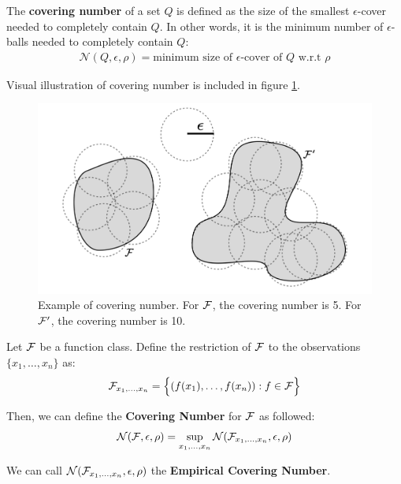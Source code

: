\begin{definition}
    The \textbf{covering number} of a set $Q$ is defined as the size of the smallest $\epsilon$-cover needed to completely contain $Q$. In other words, it is the minimum number of $\epsilon$-balls needed to completely contain $Q$:
    \begin{align*}
        \mathcal{N}(Q, \epsilon, \rho) = \text{minimum size of $\epsilon$-cover of $Q$ w.r.t $\rho$}
    \end{align*}

    \noindent Visual illustration of covering number is included in figure \ref{fig:covering_number}.
\end{definition}

\begin{figure}[ht]
    \centering
    \includegraphics[width=\textwidth]{figures/covering_number.png}
    \caption{Example of covering number. For $\mathcal{F}$, the covering number is 5. For $\mathcal{F}'$, the covering number is 10.}
    \label{fig:covering_number}
\end{figure}


\begin{definition}
    Let $\mathcal{F}$ be a function class. Define the restriction of $\mathcal{F}$ to the observations $\{x_1, \dots, x_n\}$ as:
    \begin{align*}
        \mathcal{F}_{x_1, \dots, x_n} = \Big\{ 
            (f(x_1), \dots, f(x_n)) : f \in \mathcal{F}
         \Big\}
    \end{align*}

    \noindent Then, we can define the \textbf{Covering Number} for $\mathcal{F}$ as followed:
    \begin{align*}
        \mathcal{N}(\mathcal{F}, \epsilon, \rho) = \sup_{x_1, \dots, x_n} \mathcal{N}(\mathcal{F}_{x_1, \dots, x_n}, \epsilon, \rho)
    \end{align*}

    \noindent We can call $\mathcal{N}(\mathcal{F}_{x_1, \dots, x_n}, \epsilon, \rho)$ the \textbf{Empirical Covering Number}.
\end{definition}

